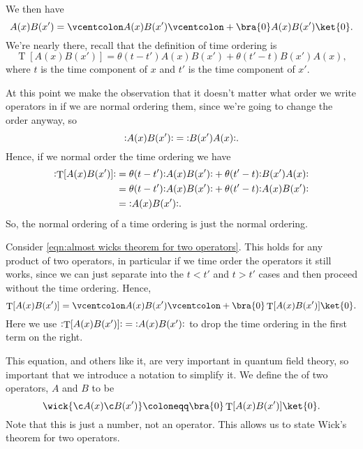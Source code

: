\documentclass[fleqn]{NotesClass}
\newcommand{\normalordering}[1]{\mathopen{\vcentcolon}{#1}\mathclose{\vcentcolon}}
\newcommand{\heaviside}{\theta}
\DeclareMathOperator{\timeOrdering}{T}
\begin{document}
    We then have
    \begin{equation}\label{eqn:almost wicks theorem for two operators}
        A(x)B(x') = \normalordering{A(x)B(x')} + \bra{0} A(x) B(x') \ket{0}.
    \end{equation}
    We're nearly there, recall that the definition of time ordering is
    \begin{equation}
        \timeOrdering[A(x)B(x')] = \heaviside(t - t')A(x)B(x') + \heaviside(t' - t)B(x')A(x),
    \end{equation}
    where \(t\) is the time component of \(x\) and \(t'\) is the time component of \(x'\).
    
    At this point we make the observation that it doesn't matter what order we write operators in if we are normal ordering them, since we're going to change the order anyway, so
    \begin{equation}
        \normalordering{A(x)B(x')} = \normalordering{B(x')A(x)}.
    \end{equation}
    Hence, if we normal order the time ordering we have
    \begin{align}
        \normalordering{\timeOrdering[A(x)B(x')]} &= \heaviside(t - t')\normalordering{A(x)B(x')} + \heaviside(t' - t)\normalordering{B(x')A(x)}\\
        &= \heaviside(t - t')\normalordering{A(x)B(x')} + \heaviside(t' - t)\normalordering{A(x)B(x')}\\
        &= \normalordering{A(x)B(x')}.
    \end{align}
    So, the normal ordering of a time ordering is just the normal ordering.
    
    Consider \cref{eqn:almost wicks theorem for two operators}.
    This holds for any product of two operators, in particular if we time order the operators it still works, since we can just separate into the \(t < t'\) and \(t > t'\) cases and then proceed without the time ordering.
    Hence,
    \begin{equation}
        \timeOrdering[A(x)B(x')] = \normalordering{A(x)B(x')} + \bra{0} \timeOrdering[A(x)B(x')] \ket{0}.
    \end{equation}
    Here we use \(\normalordering{\timeOrdering[A(x)B(x')]} = \normalordering{A(x)B(x')}\) to drop the time ordering in the first term on the right.
    
    This equation, and others like it, are very important in quantum field theory, so important that we introduce a notation to simplify it.
    We define the  of two operators, \(A\) and \(B\) to be
    \begin{equation}
        \wick{\c A(x) \c B(x')} \coloneqq \bra{0} \timeOrdering[A(x)B(x')] \ket{0}.
    \end{equation}
    Note that this is just a number, not an operator.
    This allows us to state Wick's theorem for two operators.
    
\end{document}
